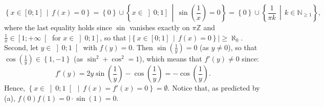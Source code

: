 \begin{solution}
    \[
        \left\{ x \in \left[0;1\right] \,\middle|\, f\left(x\right) = 0 \right\} = \left\{0\right\} \cup \left\{ x \in \left]0;1\right] \,\middle|\, \sin\left(\frac{1}{x}\right) = 0 \right\} = \left\{0\right\} \cup \left\{ \frac{1}{\pi k} \,\middle|\, k \in \mathbb{N}_{\geq 1} \right\},
    \]
    where the last equality holds since \( \sin \) vanishes exactly on \( \pi\mathbb{Z} \) and \( \frac{1}{x} \in \left[1;+\infty\right[ \) for \( x \in \left]0;1\right] \), so that \( \left|\left\{ x \in \left[0;1\right] \,\middle|\, f\left(x\right) = 0 \right\}\right| \geq \aleph_0 \). Second, let \( y \in \left]0;1\right[ \) with \( f\left(y\right) = 0 \). Then \( \sin\left(\frac{1}{y}\right) = 0 \) (as \( y \neq 0 \)), so that \( \cos\left(\frac{1}{y}\right) \in \left\{1, -1\right\} \) (as \( \sin^2+\cos^2 = 1 \)), which means that \( f'\left(y\right) \neq 0 \) since:
    \[
        f'\left(y\right) = 2y\sin\left(\frac{1}{y}\right)-\cos\left(\frac{1}{y}\right) = -\cos\left(\frac{1}{y}\right).
    \]
    Hence, \( \left\{ x \in \left]0;1\right[ \,\middle|\, f\left(x\right) = f'\left(x\right) = 0 \right\} = \emptyset \). Notice that, as predicted by (a), \( f\left(0\right)f\left(1\right) = 0 \cdot \sin\left(1\right) = 0 \).
\end{solution}
